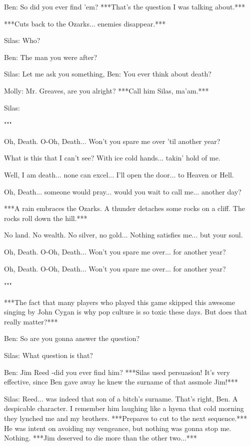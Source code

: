 \documentclass{article}
\begin{document}
Ben: So did you ever find 'em? ***That's the question I was talking about.***

***Cuts back to the Ozarks... enemies disappear.***

Silas: Who?

Ben: The man you were after?

Silas: Let me ask you something, Ben: You ever think about death?

Molly: Mr. Greaves, are you alright? ***Call him Silas, ma'am.***

Silas:
\begin{center}
    """
    
    Oh, Death. O-Oh, Death... Won't you spare me over 'til another year?
    
    What is this that I can't see? With ice cold hands... takin' hold of me.
    
    Well, I am death... none can excel... I'll open the door... to Heaven or Hell.
    
    Oh, Death... someone would pray... would you wait to call me... another day?
    
    ***A rain embraces the Ozarks. A thunder detaches some rocks on a cliff. The rocks roll down the hill.***
    
    No land. No wealth. No silver, no gold... Nothing satisfies me... but your soul.
    
    Oh, Death. O-Oh, Death... Won't you spare me over... for another year?
    
    Oh, Death. O-Oh, Death... Won't you spare me over... for another year?
    
    """
\end{center}

***The fact that many players who played this game skipped this awesome singing by John Cygan is why pop culture is so toxic these days. But does that really matter?***

Ben: So are you gonna answer the question?

Silas: What question is that?

Ben: Jim Reed -did you ever find him? ***Silas used persuasion! It's very effective, since Ben gave away he knew the surname of that assmole Jim!***

Silas: Reed... was indeed that son of a bitch's surname. That's right, Ben. A despicable character. I remember him laughing like a hyena that cold morning they lynched me and my brothers. ***Prepares to cut to the next sequence.*** He was intent on avoiding my vengeance, but nothing was gonna stop me. Nothing. ***Jim deserved to die more than the other two...***
\end{document}
